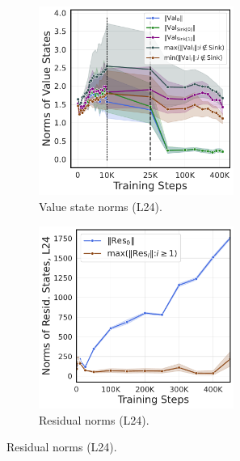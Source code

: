 \begin{figure}
    \begin{subfigure}{0.45\textwidth}
    \centering 
    \caption{Value state norms (L24).}
    \includegraphics[width=0.7\textwidth]{Figures/olmo_batch/value_norms.pdf}
    \end{subfigure}
    \begin{subfigure}{0.45\textwidth}
    \centering 
    \caption{Residual norms (L24).}
    \includegraphics[width=0.7\textwidth]{Figures/olmo_batch/layer_output_norms.pdf}
    \end{subfigure}


\end{figure}
